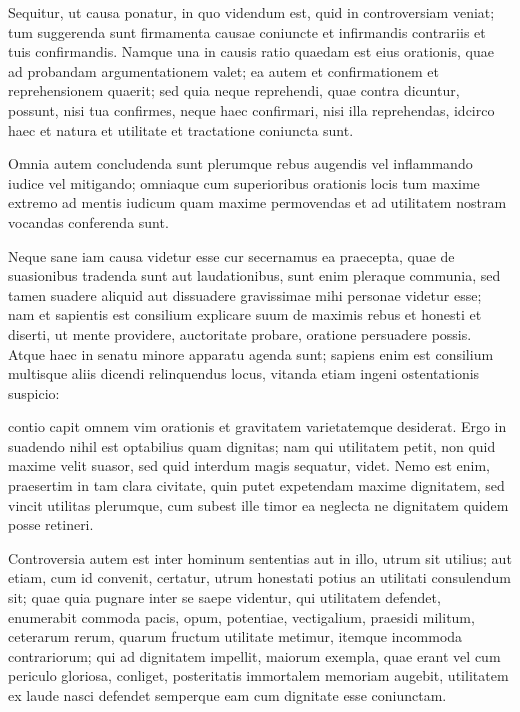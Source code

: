  Sequitur, ut causa ponatur, in quo videndum est, quid in controversiam veniat; tum suggerenda sunt firmamenta causae coniuncte et infirmandis contrariis et tuis confirmandis. Namque una in causis ratio quaedam est eius orationis, quae ad probandam argumentationem valet; ea autem et confirmationem et reprehensionem quaerit; sed quia neque reprehendi, quae contra dicuntur, possunt, nisi tua confirmes, neque haec confirmari, nisi illa reprehendas, idcirco haec et natura et utilitate et tractatione coniuncta sunt.

 Omnia autem concludenda sunt plerumque rebus augendis vel inflammando iudice vel mitigando; omniaque cum superioribus orationis locis tum maxime extremo ad mentis iudicum quam maxime permovendas et ad utilitatem nostram vocandas conferenda sunt.

 Neque sane iam causa videtur esse cur secernamus ea praecepta, quae de suasionibus tradenda sunt aut laudationibus, sunt enim pleraque communia, sed tamen suadere aliquid aut dissuadere gravissimae mihi personae videtur esse; nam et sapientis est consilium explicare suum de maximis rebus et honesti et diserti, ut mente providere, auctoritate probare, oratione persuadere possis. Atque haec in senatu minore apparatu agenda sunt; sapiens enim est consilium multisque aliis dicendi relinquendus locus, vitanda etiam ingeni ostentationis suspicio:

 contio capit omnem vim orationis et gravitatem varietatemque desiderat. Ergo in suadendo nihil est optabilius quam dignitas; nam qui utilitatem petit, non quid maxime velit suasor, sed quid interdum magis sequatur, videt. Nemo est enim, praesertim in tam clara civitate, quin putet expetendam maxime dignitatem, sed vincit utilitas plerumque, cum subest ille timor ea neglecta ne dignitatem quidem posse retineri.

 Controversia autem est inter hominum sententias aut in illo, utrum sit utilius; aut etiam, cum id convenit, certatur, utrum honestati potius an utilitati consulendum sit; quae quia pugnare inter se saepe videntur, qui utilitatem defendet, enumerabit commoda pacis, opum, potentiae, vectigalium, praesidi militum, ceterarum rerum, quarum fructum utilitate metimur, itemque incommoda contrariorum; qui ad dignitatem impellit, maiorum exempla, quae erant vel cum periculo gloriosa, conliget, posteritatis immortalem memoriam augebit, utilitatem ex laude nasci defendet semperque eam cum dignitate esse coniunctam.

